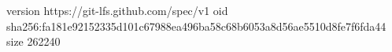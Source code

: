 version https://git-lfs.github.com/spec/v1
oid sha256:fa181e92152335d101c67988ea496ba58c68b6053a8d56ae5510d8fe7f6fda44
size 262240
